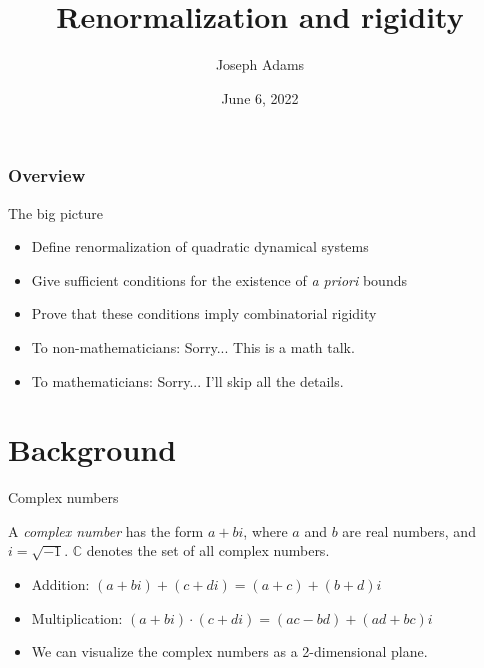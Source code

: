 \documentclass{beamer}
\title{Renormalization and rigidity}
\author{Joseph Adams}
\date{June 6, 2022}
\begin{document}
\begin{frame}

\titlepage

\end{frame}

\begin{frame}
    \frametitle{Overview}
    \tableofcontents
\end{frame}

\begin{frame}{The big picture}
\begin{itemize}
    \item Define renormalization of quadratic dynamical systems
    \item Give sufficient conditions for the existence of \emph{a priori} bounds
    \item Prove that these conditions imply combinatorial rigidity
    \item To non-mathematicians: Sorry... This is a math talk.
    \item To mathematicians: Sorry... I'll skip all the details.
\end{itemize}
\end{frame}

\section{Background}
\begin{frame}{Complex numbers}

\begin{definition}
A \emph{complex number} has the form $a+bi$, where $a$ and $b$ are real numbers, and $i=\sqrt{-1}$. $\mathbb{C}$ denotes the set of all complex numbers.
\end{definition}

\begin{itemize}
    \item Addition: $(a+bi)+(c+di)=(a+c)+(b+d)i$
    \item Multiplication: $(a+bi)\cdot(c+di)=(ac-bd)+(ad+bc)i$
    \item We can visualize the complex numbers as a 2-dimensional plane.
\end{itemize}

\end{frame}
\end{document}
